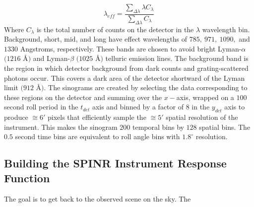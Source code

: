 \documentclass[oneside]{book}
\theoremstyle{definition}
\numberwithin{equation}{section}
\begin{document}
\begin{equation}
\nonumber \lambda_{eff} = \frac{\underset{\Delta \lambda}\sum \lambda C_{\lambda}}{\underset{\Delta \lambda}\sum C_{\lambda}}
\end{equation}
Where $C_{\lambda}$ is the total number of counts on the detector in the $\lambda$ wavelength bin. Background, short, mid, and long have effect wavelengths of $785,\ 971,\ 1090,$ and $1330$ Angstroms, respectively. These bands are chosen to avoid bright Lyman-$\alpha$ $(1216$ \r{A}$)$ and Lyman-$\beta$ $(1025$ \r{A}$)$ telluric emission lines. The background band is the region in which detector background from dark counts and grating-scattered photons occur. This covers a dark area of the detector shortward of the Lyman limit $(912$ \r{A}$)$. The sinograms are created by selecting the data corresponding to these regions on the detector and summing over the $x-$axis, wrapped on a $100$ second roll period in the $t_{det}$ axis and binned by a factor of $8$ in the $y_{det}$ axis to produce $\cong 6'$ pixels that efficiently sample the $\cong 5'$ spatial resolution of the instrument. This makes the sinogram $200$ temporal bins by $128$ spatial bins. The $0.5$ second time bins are equivalent to roll angle bins with $1.8^{\circ}$ resolution. 

\subsection{Building the SPINR Instrument Response Function}

The goal is to get back to the observed scene on the sky. The 
\end{document}
